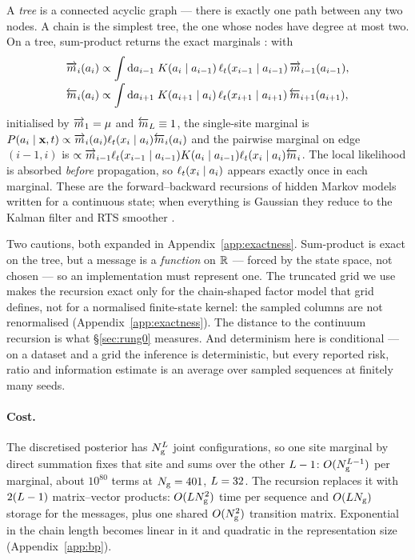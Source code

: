 \documentclass{article}
\theoremstyle{definition}
\theoremstyle{plain}
\begin{document}
A \emph{tree} is a connected acyclic graph --- there is exactly one path between any two nodes. A
chain is the simplest tree, the one whose nodes have degree at most two. On a tree, sum-product
returns the exact marginals \citep{pearl1988,kschischang2001factor,mezard2009information}: with
\begin{align}
\label{eq:messages}
\overrightarrow{m}_{i}(a_i) &\propto \int \mathrm{d}a_{i-1}\;
K(a_i\mid a_{i-1})\,\ell_t(x_{i-1}\mid a_{i-1})\,\overrightarrow{m}_{i-1}(a_{i-1}), \nonumber\\[-2pt]
\overleftarrow{m}_{i}(a_i) &\propto \int \mathrm{d}a_{i+1}\;
K(a_{i+1}\mid a_i)\,\ell_t(x_{i+1}\mid a_{i+1})\,\overleftarrow{m}_{i+1}(a_{i+1}),
\end{align}
initialised by $\overrightarrow{m}_1 = \mu$ and $\overleftarrow{m}_{L}\equiv 1$, the single-site marginal is
$P(a_i\mid \mathbf{x},t) \propto \overrightarrow{m}_i(a_i)\ell_t(x_i\mid a_i)\overleftarrow{m}_i(a_i)$ and the pairwise marginal on
edge $(i-1,i)$ is $\propto \overrightarrow{m}_{i-1}\ell_t(x_{i-1}\mid a_{i-1})K(a_i\mid
a_{i-1})\ell_t(x_i\mid a_i)\overleftarrow{m}_i$. The local likelihood is absorbed \emph{before} propagation, so
$\ell_t(x_i\mid a_i)$ appears exactly once in each marginal. These are the forward--backward
recursions of hidden Markov models \citep{baum1970,rabiner1989tutorial} written for a continuous state;
when everything is Gaussian they reduce to the Kalman filter and RTS smoother
\citep{kalman1960new,rauch1965maximum}.


Two cautions, both expanded in Appendix~\ref{app:exactness}. Sum-product is exact on the tree,
but a message is a \emph{function} on $\mathbb{R}$ --- forced by the state space, not chosen --- so an
implementation must represent one. The truncated grid we use makes the recursion exact only
for the chain-shaped factor model that grid defines, not for a normalised finite-state kernel:
the sampled columns are not renormalised (Appendix~\ref{app:exactness}). The distance to the
continuum recursion is what \S\ref{sec:rung0} measures. And determinism here is conditional --- on
a dataset and a grid the inference is deterministic, but every reported risk, ratio and
information estimate is an average over sampled sequences at finitely many seeds.

\paragraph{Cost.} The discretised posterior has $N_{\mathrm{g}}^{L}$ joint configurations, so one
site marginal by direct summation fixes that site and sums over the other $L-1$:
$O(N_{\mathrm{g}}^{L-1})$ per marginal, about $10^{80}$ terms at $N_{\mathrm{g}}=401$, $L=32$. The recursion
replaces it with $2(L-1)$ matrix--vector products: $O(LN_{\mathrm{g}}^{2})$ time per sequence
and $O(LN_{\mathrm{g}})$ storage for the messages, plus one shared $O(N_{\mathrm{g}}^{2})$ transition
matrix. Exponential in the chain length becomes linear in it and quadratic in the representation
size (Appendix~\ref{app:bp}).
\end{document}
